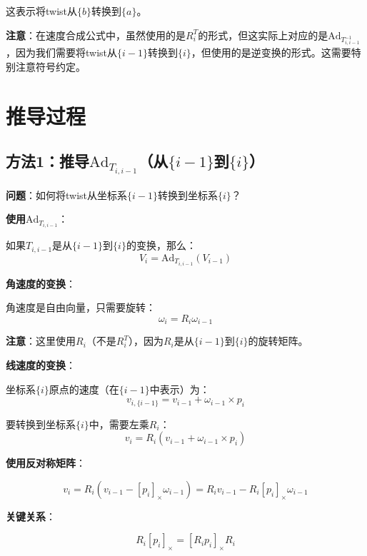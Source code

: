 \documentclass[12pt,a4paper]{article}
\begin{document}
这表示将twist从$\{b\}$转换到$\{a\}$。

\textbf{注意}：在速度合成公式中，虽然使用的是$R_i^T$的形式，但这实际上对应的是$\text{Ad}_{T_{i,i-1}^{-1}}$，因为我们需要将twist从$\{i-1\}$转换到$\{i\}$，但使用的是逆变换的形式。这需要特别注意符号约定。

\section{推导过程}

\subsection{方法1：推导$\text{Ad}_{T_{i,i-1}}$（从$\{i-1\}$到$\{i\}$）}

\textbf{问题}：如何将twist从坐标系$\{i-1\}$转换到坐标系$\{i\}$？

\textbf{使用$\text{Ad}_{T_{i,i-1}}$}：

如果$T_{i,i-1}$是从$\{i-1\}$到$\{i\}$的变换，那么：
\begin{equation}
V_i = \text{Ad}_{T_{i,i-1}}(V_{i-1})
\end{equation}

\textbf{角速度的变换}：

角速度是自由向量，只需要旋转：
\begin{equation}
\omega_i = R_i \omega_{i-1}
\end{equation}

\textbf{注意}：这里使用$R_i$（不是$R_i^T$），因为$R_i$是从$\{i-1\}$到$\{i\}$的旋转矩阵。

\textbf{线速度的变换}：

坐标系$\{i\}$原点的速度（在$\{i-1\}$中表示）为：
\begin{equation}
v_{i,\{i-1\}} = v_{i-1} + \omega_{i-1} \times p_i
\end{equation}

要转换到坐标系$\{i\}$中，需要左乘$R_i$：
\begin{equation}
v_i = R_i (v_{i-1} + \omega_{i-1} \times p_i)
\end{equation}

\textbf{使用反对称矩阵}：

\begin{equation}
v_i = R_i (v_{i-1} - [p_i]_{\times} \omega_{i-1}) = R_i v_{i-1} - R_i [p_i]_{\times} \omega_{i-1}
\end{equation}

\textbf{关键关系}：

\begin{equation}
R_i [p_i]_{\times} = [R_i p_i]_{\times} R_i
\end{equation}
\end{document}
